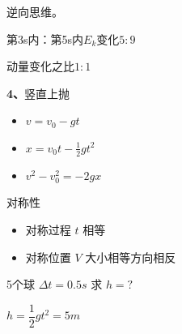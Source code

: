 逆向思维。
\begin{problem}
\begin{solution}
第3s内：第5s内\quad $E_k$变化\quad $5:9$ %

动量变化之比\quad $1:1$
\end{solution}
\end{problem}
\textbf{4、}竖直上抛
\begin{itemize}
\item $v=v_0-gt$
\item $x=v_0t-\frac12gt^2$
\item $v^2-v_0^2=-2gx$
\end{itemize}
对称性
\begin{itemize}
\item 对称过程 $t$ 相等
\item 对称位置 $V$ 大小相等方向相反
\end{itemize}
\begin{problem}
5个球 $\Delta t=0.5\unit{s}$ 求 $h=?$
\begin{solution}
$h=\dfrac12gt^2=5\unit{m}$
\end{solution}
\end{problem}

